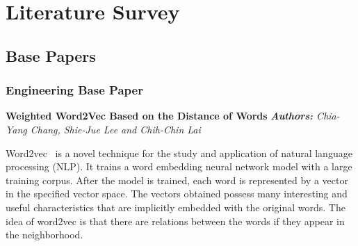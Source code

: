 \chapter{Literature Survey}


\section{Base Papers}

\subsection{Engineering Base Paper}

\noindent
\textbf{Weighted Word2Vec Based on the Distance of Words}
\textit{\textbf{Authors:} Chia-Yang Chang, Shie-Jue Lee and Chih-Chin Lai}

Word2vec~\citep{chang2017weighted} is a novel technique for the study and application of natural language processing (NLP). It trains a word embedding neural network model with a large training corpus. After the model is trained, each word is represented by a vector in the specified vector space. The vectors obtained possess many interesting and useful characteristics that are implicitly embedded with the original words. The idea of word2vec is that there are relations between the words if they appear in the neighborhood.